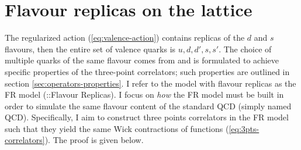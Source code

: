 \documentclass[english, LaM, oneside, noexaminfo]{sapthesis}
\begin{document}
\section{Flavour replicas on the lattice}
\noindent
The regularized action (\ref{eq:valence-action}) contains replicas of the $d$ and $s$ flavours, then the entire set of valence quarks is $u,d,d',s,s'$.
The choice of multiple quarks of the same flavour comes from \cite{FR2}  and is formulated to achieve specific properties of the three-point correlators;
such properties are outlined in section \ref{sec:operators-properties}.
I refer to the model with flavour replicas as the FR model (::Flavour Replicas).
\newline
I focus on \textit{how} the FR model must be built in order to simulate the same flavour content of the standard QCD (simply named QCD).
Specifically, I aim to construct three points correlators in the FR model such that they yield the same Wick contractions of functions (\ref{eq:3pts-correlators}).
The proof is given below.
\end{document}
